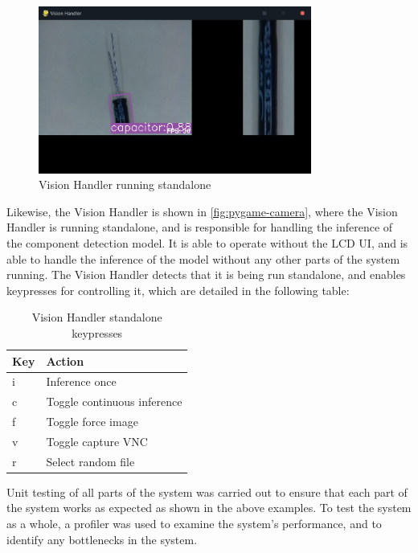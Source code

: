 \begin{figure}[H]
  \centering
  \includegraphics[width=0.8\textwidth]{imgs/software/visionhandler.jpg}
  \caption{Vision Handler running standalone}
  \label{fig:pygame-camera}
\end{figure}

Likewise, the Vision Handler is shown in \autoref{fig:pygame-camera}, where the Vision Handler is running standalone, and is responsible for handling the inference of the component detection model. It is able to operate without the LCD UI, and is able to handle the inference of the model without any other parts of the system running. The Vision Handler detects that it is being run standalone, and enables keypresses for controlling it, which are detailed in the following table:

\begin{table}[H]
  \centering
  \begin{tabularx}{\textwidth}{|X|X|}
    \hline
    \textbf{Key} & \textbf{Action} \\
    \hline
    i & Inference once \\
    \hline
    c & Toggle continuous inference \\
    \hline
    f & Toggle force image \\
    \hline
    v & Toggle capture VNC \\
    \hline
    r & Select random file \\
    \hline
  \end{tabularx}
  \caption{Vision Handler standalone keypresses}
  \label{tab:vision-handler-keypresses}
\end{table}

Unit testing of all parts of the system was carried out to ensure that each part of the system works as expected as shown in the above examples. To test the system as a whole, a profiler was used to examine the system's performance, and to identify any bottlenecks in the system.

